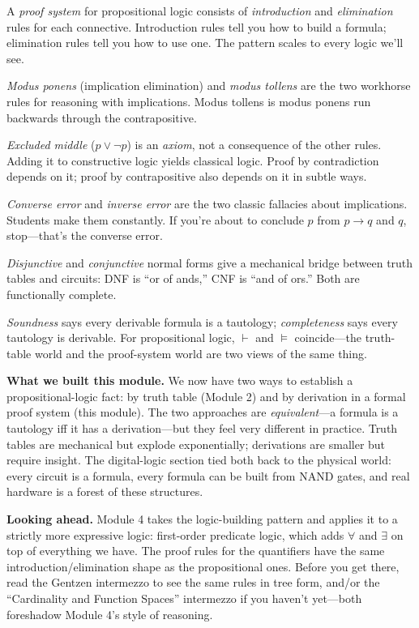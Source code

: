 \documentclass[11pt]{article}
\begin{document}
\begin{keytakeaway}
  \item A \emph{proof system} for propositional logic consists of \emph{introduction} and \emph{elimination} rules for each connective. Introduction rules tell you how to build a formula; elimination rules tell you how to use one. The pattern scales to every logic we'll see.
  \item \emph{Modus ponens} (implication elimination) and \emph{modus tollens} are the two workhorse rules for reasoning with implications. Modus tollens is modus ponens run backwards through the contrapositive.
  \item \emph{Excluded middle} ($p \vee \lnot p$) is an \emph{axiom}, not a consequence of the other rules. Adding it to constructive logic yields classical logic. Proof by contradiction depends on it; proof by contrapositive also depends on it in subtle ways.
  \item \emph{Converse error} and \emph{inverse error} are the two classic fallacies about implications. Students make them constantly. If you're about to conclude $p$ from $p \to q$ and $q$, stop---that's the converse error.
  \item \emph{Disjunctive} and \emph{conjunctive} normal forms give a mechanical bridge between truth tables and circuits: DNF is ``or of ands,'' CNF is ``and of ors.'' Both are functionally complete.
  \item \emph{Soundness} says every derivable formula is a tautology; \emph{completeness} says every tautology is derivable. For propositional logic, $\vdash$ and $\models$ coincide---the truth-table world and the proof-system world are two views of the same thing.
\end{keytakeaway}

\begin{summarybox}
\textbf{What we built this module.} We now have two ways to establish a propositional-logic fact: by truth table (Module 2) and by derivation in a formal proof system (this module). The two approaches are \emph{equivalent}---a formula is a tautology iff it has a derivation---but they feel very different in practice. Truth tables are mechanical but explode exponentially; derivations are smaller but require insight. The digital-logic section tied both back to the physical world: every circuit is a formula, every formula can be built from NAND gates, and real hardware is a forest of these structures.

\medskip
\textbf{Looking ahead.} Module 4 takes the logic-building pattern and applies it to a strictly more expressive logic: first-order predicate logic, which adds $\forall$ and $\exists$ on top of everything we have. The proof rules for the quantifiers have the same introduction/elimination shape as the propositional ones. Before you get there, read the Gentzen intermezzo to see the same rules in tree form, and/or the ``Cardinality and Function Spaces'' intermezzo if you haven't yet---both foreshadow Module 4's style of reasoning.
\end{summarybox}
\end{document}
